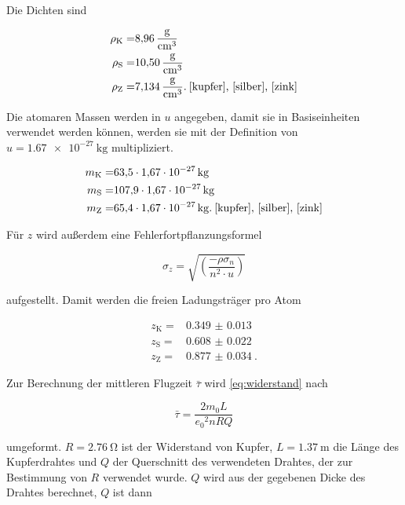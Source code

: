 Die Dichten sind

\begin{align}
    \rho _\text{K} =& \SI{8.96}{\gram\per\cubic\centi\meter} \\
    \rho _\text{S} =& \SI{10.50}{\gram\per\cubic\centi\meter} \\
    \rho _\text{Z} =& \SI{7.134}{\gram\per\cubic\centi\meter}.\:\text{\cite{kupfer}, \cite{silber}, \cite{zink}}
    \label{eq:rho}
\end{align}

Die atomaren Massen werden in $u$ angegeben, damit sie in Basiseinheiten verwendet werden können, werden sie mit der Definition von $u = \SI{1.67e-27}{\kilo\gram}$ multipliziert.\cite{physics_constants}

\begin{align}
    m_\text{K} =& \SI{63.5}{} \cdot \SI{1.67e-27}{\kilo\gram} \\
    m_\text{S} =& \SI{107.9}{} \cdot \SI{1.67e-27}{\kilo\gram} \\
    m_\text{Z} =& \SI{65.4}{} \cdot \SI{1.67e-27}{\kilo\gram}.\:\text{\cite{kupfer}, \cite{silber}, \cite{zink}}
    \label{eq:m}
\end{align}

Für $z$ wird außerdem eine Fehlerfortpflanzungsformel

\begin{equation}
   \sigma _z = \sqrt{\left(\frac{-\rho \sigma _n}{n^2 \cdot u}\right)}
    \label{eq:nproatom_fehler}
\end{equation}

aufgestellt.
Damit werden die freien Ladungsträger pro Atom

\begin{align}
    z_\text{K} =& \SI{0.349(13)}{} \\
    z_\text{S} =& \SI{0.608(22)}{} \\
    z_\text{Z} =& \SI{0.877(34)}{}.
    \label{eq:z1}
\end{align}

Zur Berechnung der mittleren Flugzeit $\bar{\tau}$ wird \autoref{eq:widerstand} nach

\begin{equation}
    \bar{\tau} = \frac{2m_0 L}{{e_0}^2 n R Q}
    \label{eq:tau}
\end{equation}

umgeformt.
$R = \SI{2.76}{\ohm}$ ist der Widerstand von Kupfer, $L = \SI{1.37}{\meter}$ die Länge des Kupferdrahtes und $Q$ der Querschnitt des verwendeten Drahtes, der zur Bestimmung von $R$ verwendet wurde.
$Q$ wird aus der gegebenen Dicke des Drahtes berechnet, $Q$ ist dann

